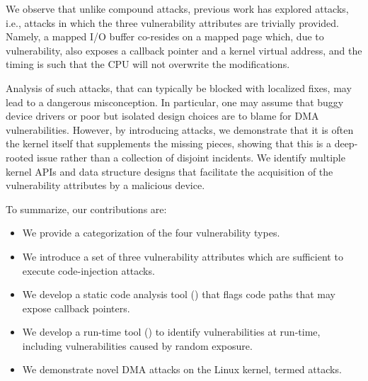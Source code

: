 We observe that unlike compound attacks, previous work has explored \simple{} attacks, i.e., attacks in which the three vulnerability attributes are trivially provided. 
Namely, a mapped I/O buffer co-resides on a mapped page which, due to \subpage{} vulnerability, also exposes a callback pointer and a kernel virtual address, and the timing is such that the CPU will not overwrite the modifications.

Analysis of such \simple{} attacks, that can typically be blocked with localized fixes, may lead to a dangerous misconception. In particular, one may assume that buggy device drivers or poor but isolated design choices are to blame for DMA vulnerabilities.
However, by introducing \compound attacks, we demonstrate that it is often the kernel itself that supplements the missing pieces, showing that this is a deep-rooted issue rather than a collection of disjoint incidents.
We identify multiple kernel APIs and data structure designs that facilitate the acquisition of the vulnerability attributes by a malicious device.


To summarize, our contributions are:
\begin{itemize}
    \item We provide a categorization of the four \subpage{} vulnerability types.
    \item We introduce a set of three vulnerability attributes which are sufficient to execute code-injection attacks.
    \item We develop a static code analysis tool (\tool) that flags code paths that may expose callback pointers.
    \item We develop a run-time tool (\dkasan) to identify \subpage{} vulnerabilities at run-time, including vulnerabilities caused by random exposure.
    \item We demonstrate novel DMA attacks on the Linux kernel, termed \compound{} attacks.
\end{itemize}


